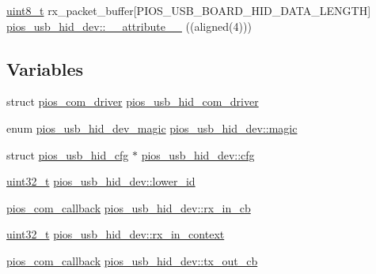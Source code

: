 \begin{DoxyCompactItemize}
\item 
\hyperlink{stdint_8h_aba7bc1797add20fe3efdf37ced1182c5}{uint8\-\_\-t} rx\-\_\-packet\-\_\-buffer\mbox{[}P\-I\-O\-S\-\_\-\-U\-S\-B\-\_\-\-B\-O\-A\-R\-D\-\_\-\-H\-I\-D\-\_\-\-D\-A\-T\-A\-\_\-\-L\-E\-N\-G\-T\-H\mbox{]} \hyperlink{group___p_i_o_s___u_s_b___h_i_d_ga078ed58bf52ceaf8ee4248216c518445}{pios\-\_\-usb\-\_\-hid\-\_\-dev\-::\-\_\-\-\_\-attribute\-\_\-\-\_\-} ((aligned(4)))
\end{DoxyCompactItemize}
\subsection*{Variables}
\begin{DoxyCompactItemize}
\item 
struct \hyperlink{structpios__com__driver}{pios\-\_\-com\-\_\-driver} \hyperlink{group___p_i_o_s___u_s_b___h_i_d_ga7bc5f832e095cad60f463436e377bb5d}{pios\-\_\-usb\-\_\-hid\-\_\-com\-\_\-driver}
\item 
enum \hyperlink{group___p_i_o_s___u_s_b___h_i_d_ga7769ddfbb58cbf13d0e0662f4d441899}{pios\-\_\-usb\-\_\-hid\-\_\-dev\-\_\-magic} \hyperlink{group___p_i_o_s___u_s_b___h_i_d_ga31a2e7a6eac13138808d37592a55be4e}{pios\-\_\-usb\-\_\-hid\-\_\-dev\-::magic}
\item 
struct \hyperlink{structpios__usb__hid__cfg}{pios\-\_\-usb\-\_\-hid\-\_\-cfg} $\ast$ \hyperlink{group___p_i_o_s___u_s_b___h_i_d_gaed58572b60b7d6cfa67fd0c4d66e882c}{pios\-\_\-usb\-\_\-hid\-\_\-dev\-::cfg}
\item 
\hyperlink{stdint_8h_a435d1572bf3f880d55459d9805097f62}{uint32\-\_\-t} \hyperlink{group___p_i_o_s___u_s_b___h_i_d_ga088a37cd66d7047583d47a16a3381e4f}{pios\-\_\-usb\-\_\-hid\-\_\-dev\-::lower\-\_\-id}
\item 
\hyperlink{group___p_i_o_s___c_o_m_ga23f1888821f1f74a50c02adc459df597}{pios\-\_\-com\-\_\-callback} \hyperlink{group___p_i_o_s___u_s_b___h_i_d_ga0d491f712337fdf9d08be6c72ac81094}{pios\-\_\-usb\-\_\-hid\-\_\-dev\-::rx\-\_\-in\-\_\-cb}
\item 
\hyperlink{stdint_8h_a435d1572bf3f880d55459d9805097f62}{uint32\-\_\-t} \hyperlink{group___p_i_o_s___u_s_b___h_i_d_ga2ce875c5efa2b6b450f143818872513a}{pios\-\_\-usb\-\_\-hid\-\_\-dev\-::rx\-\_\-in\-\_\-context}
\item 
\hyperlink{group___p_i_o_s___c_o_m_ga23f1888821f1f74a50c02adc459df597}{pios\-\_\-com\-\_\-callback} \hyperlink{group___p_i_o_s___u_s_b___h_i_d_ga04c76a0e0e88338371d2f12cd9749309}{pios\-\_\-usb\-\_\-hid\-\_\-dev\-::tx\-\_\-out\-\_\-cb}
\item 

\end{DoxyCompactItemize}
